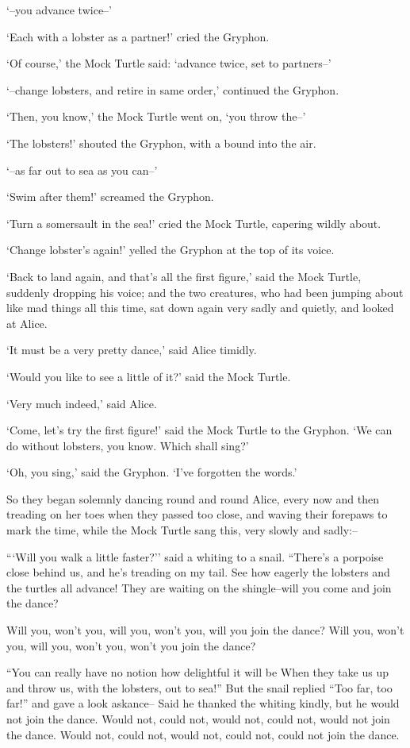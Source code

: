 \documentclass[statementpaper,twoside,openany]{memoir}
\begin{document}
`--you advance twice--'

`Each with a lobster as a partner!' cried the Gryphon.

`Of course,' the Mock Turtle said: `advance twice, set to partners--'

`--change lobsters, and retire in same order,' continued the Gryphon.

`Then, you know,' the Mock Turtle went on, `you throw the--'

`The lobsters!' shouted the Gryphon, with a bound into the air.

`--as far out to sea as you can--'

`Swim after them!' screamed the Gryphon.

`Turn a somersault in the sea!' cried the Mock Turtle, capering wildly about.

`Change lobster's again!' yelled the Gryphon at the top of its voice.

`Back to land again, and that's all the first figure,' said the Mock Turtle, suddenly dropping his voice; and the two creatures, who had been jumping about like mad things all this time, sat down again very sadly and quietly, and looked at Alice.

`It must be a very pretty dance,' said Alice timidly.

`Would you like to see a little of it?' said the Mock Turtle.

`Very much indeed,' said Alice.

`Come, let's try the first figure!' said the Mock Turtle to the Gryphon. `We can do without lobsters, you know. Which shall sing?'

`Oh, you sing,' said the Gryphon. `I've forgotten the words.'

So they began solemnly dancing round and round Alice, every now and then treading on her toes when they passed too close, and waving their forepaws to mark the time, while the Mock Turtle sang this, very slowly and sadly:--

```Will you walk a little faster?'' said a whiting to a snail. ``There's a porpoise close behind us, and he's treading on my tail. See how eagerly the lobsters and the turtles all advance! They are waiting on the shingle--will you come and join the dance?

Will you, won't you, will you, won't you, will you join the dance? Will you, won't you, will you, won't you, won't you join the dance?

``You can really have no notion how delightful it will be When they take us up and throw us, with the lobsters, out to sea!'' But the snail replied ``Too far, too far!'' and gave a look askance-- Said he thanked the whiting kindly, but he would not join the dance. Would not, could not, would not, could not, would not join the dance. Would not, could not, would not, could not, could not join the dance.
\end{document}
